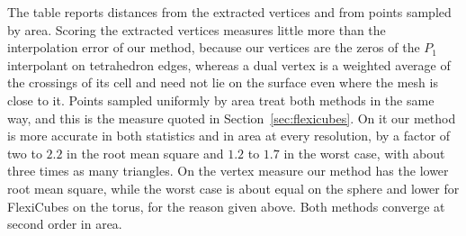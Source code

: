 \documentclass[11pt]{article}
\theoremstyle{definition}
\begin{document}
The table reports distances from the extracted vertices and from points
sampled by area. Scoring the extracted vertices
measures little more than the interpolation error of our method, because our
vertices are the zeros of the $P_1$ interpolant on tetrahedron edges,
whereas a dual vertex is a weighted average of the crossings of its cell and
need not lie on the surface even where the mesh is close to it. Points
sampled uniformly by area treat both methods in the same way, and this is
the measure quoted in Section~\ref{sec:flexicubes}. On it our method is more
accurate in both statistics and in area at every resolution, by a factor of
two to $2.2$ in the root mean square and $1.2$ to $1.7$ in the worst case,
with about three times as many triangles. On the vertex measure our method
has the lower root mean square, while the worst case is about equal on the
sphere and lower for FlexiCubes on the torus, for the reason given above.
Both methods converge at second order in area.
\end{document}
